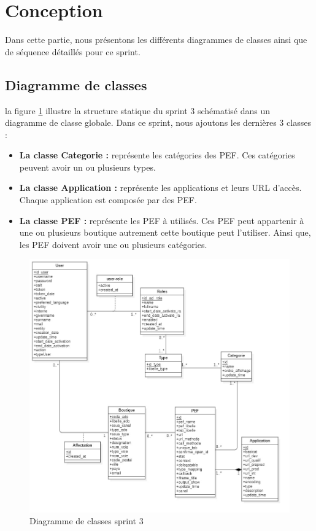 \section{Conception}
Dans cette partie, nous présentons les différents diagrammes de classes ainsi que de séquence détaillés pour ce sprint. 


\subsection{Diagramme de classes}
la figure \ref{fig:classdiag-sprint3} illustre la structure statique du sprint 3 schématisé dans un diagramme de classe globale.
Dans ce sprint, nous ajoutons les dernières 3 classes :
\begin{itemize}
	\item \textbf{La classe Categorie :} représente les catégories des PEF. Ces catégories peuvent avoir un ou plusieurs types.
	\item \textbf{La classe Application :} représente les applications et leurs URL d'accès. Chaque application est composée par des PEF.
	\item \textbf{La classe PEF :} représente les PEF à utilisés. Ces PEF peut appartenir à une ou plusieurs boutique autrement cette boutique peut l'utiliser. Ainsi que, les PEF doivent avoir une ou plusieurs catégories. 
\end{itemize}
\begin{figure}[H]
	\centering
	\includegraphics[width=1\linewidth]{img/conception/classes/ClassDiag-sprint3}
	\caption[Diagramme de classes sprint 3]{Diagramme de classes sprint 3}
	\label{fig:classdiag-sprint3}
\end{figure}

